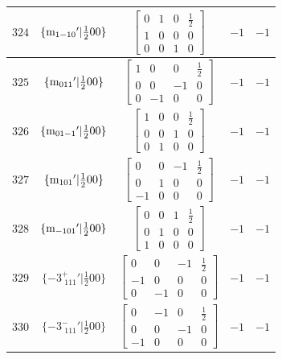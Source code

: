 \documentclass[fleqn,8pt]{jsarticle}
\begin{document}
\begin{longtable}{ccccc}
$ 324 $ & $ \{{\rm m}_{1-10}{}'|\frac{1}{2} 0 0\} $ & $ \begin{bmatrix} 0 & 1 & 0 & \frac{1}{2} \\ 1 & 0 & 0 & 0 \\ 0 & 0 & 1 & 0 \end{bmatrix} $ & $ -1 $ & $ -1 $ \\ \hline
$ 325 $ & $ \{{\rm m}_{011}{}'|\frac{1}{2} 0 0\} $ & $ \begin{bmatrix} 1 & 0 & 0 & \frac{1}{2} \\ 0 & 0 & -1 & 0 \\ 0 & -1 & 0 & 0 \end{bmatrix} $ & $ -1 $ & $ -1 $ \\ \hline
$ 326 $ & $ \{{\rm m}_{01-1}{}'|\frac{1}{2} 0 0\} $ & $ \begin{bmatrix} 1 & 0 & 0 & \frac{1}{2} \\ 0 & 0 & 1 & 0 \\ 0 & 1 & 0 & 0 \end{bmatrix} $ & $ -1 $ & $ -1 $ \\ \hline
$ 327 $ & $ \{{\rm m}_{101}{}'|\frac{1}{2} 0 0\} $ & $ \begin{bmatrix} 0 & 0 & -1 & \frac{1}{2} \\ 0 & 1 & 0 & 0 \\ -1 & 0 & 0 & 0 \end{bmatrix} $ & $ -1 $ & $ -1 $ \\ \hline
$ 328 $ & $ \{{\rm m}_{-101}{}'|\frac{1}{2} 0 0\} $ & $ \begin{bmatrix} 0 & 0 & 1 & \frac{1}{2} \\ 0 & 1 & 0 & 0 \\ 1 & 0 & 0 & 0 \end{bmatrix} $ & $ -1 $ & $ -1 $ \\ \hline
$ 329 $ & $ \{-3^{+}_{\,\,111}{}'|\frac{1}{2} 0 0\} $ & $ \begin{bmatrix} 0 & 0 & -1 & \frac{1}{2} \\ -1 & 0 & 0 & 0 \\ 0 & -1 & 0 & 0 \end{bmatrix} $ & $ -1 $ & $ -1 $ \\ \hline
$ 330 $ & $ \{-3^{-}_{\,\,111}{}'|\frac{1}{2} 0 0\} $ & $ \begin{bmatrix} 0 & -1 & 0 & \frac{1}{2} \\ 0 & 0 & -1 & 0 \\ -1 & 0 & 0 & 0 \end{bmatrix} $ & $ -1 $ & $ -1 $ \\ \hline

\end{longtable}
\end{document}
